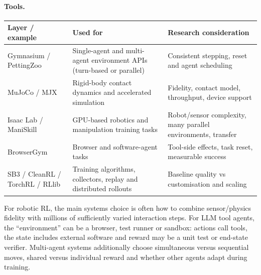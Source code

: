 \paragraph{Tools.}
\begin{center}\begingroup\footnotesize\setlength{\tabcolsep}{3pt}
\begin{tabular}{|p{.25\linewidth}|p{.34\linewidth}|p{.33\linewidth}|}\hline
\textbf{Layer / example} & \textbf{Used for} & \textbf{Research consideration}\\ \hline
Gymnasium / PettingZoo & Single-agent and multi-agent environment APIs (turn-based or parallel) & Consistent stepping, reset and agent scheduling\\ \hline
MuJoCo / MJX & Rigid-body contact dynamics and accelerated simulation & Fidelity, contact model, throughput, device support\\ \hline
Isaac Lab / ManiSkill & GPU-based robotics and manipulation training tasks & Robot/sensor complexity, many parallel environments, transfer\\ \hline
BrowserGym & Browser and software-agent tasks & Tool-side effects, task reset, measurable success\\ \hline
SB3 / CleanRL / TorchRL / RLlib & Training algorithms, collectors, replay and distributed rollouts & Baseline quality vs customisation and scaling\\ \hline
\end{tabular}\endgroup\end{center}
For robotic RL, the main systems choice is often how to combine sensor/physics fidelity with millions of sufficiently varied interaction steps.
For LLM tool agents, the ``environment'' can be a browser, test runner or sandbox: actions call tools, the state includes external software and reward may be a unit test or end-state verifier.
Multi-agent systems additionally choose simultaneous versus sequential moves, shared versus individual reward and whether other agents adapt during training.

